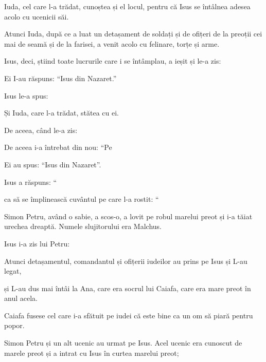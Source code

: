 {Iuda, cel care l-a trădat, cunoștea și el locul, pentru că Isus se întâlnea adesea acolo cu ucenicii săi.

Atunci Iuda, după ce a luat un detașament de soldați și de ofițeri de la preoții cei mai de seamă și de la farisei, a venit acolo cu felinare, torțe și arme.

Isus, deci, știind toate lucrurile care i se întâmplau, a ieșit și le-a zis:
{}


\par }{\PP {}Ei I-au răspuns: “Isus din Nazaret.”

\par }{\PP Isus le-a spus:
{}

\par }{\PP Și Iuda, care l-a trădat, stătea cu ei.

De aceea, când le-a zis:
{}


\par }{\PP {}De aceea i-a întrebat din nou: “Pe
{}

\par }{\PP Ei au spus: “Isus din Nazaret”.


\par }{\PP {}Isus a răspuns: “{}

ca să se împlinească cuvântul pe care l-a rostit: “{}


\par }{\PP {}Simon Petru, având o sabie, a scos-o, a lovit pe robul marelui preot și i-a tăiat urechea dreaptă. Numele slujitorului era Malchus.

Isus i-a zis lui Petru:
{}


\par }{\PP {}Atunci detașamentul, comandantul și ofițerii iudeilor au prins pe Isus și L-au legat,

și L-au dus mai întâi la Ana, care era socrul lui Caiafa, care era mare preot în anul acela.

Caiafa fusese cel care i-a sfătuit pe iudei că este bine ca un om să piară pentru popor.


\par }{\PP {}Simon Petru și un alt ucenic au urmat pe Isus. Acel ucenic era cunoscut de marele preot și a intrat cu Isus în curtea marelui preot;

}
